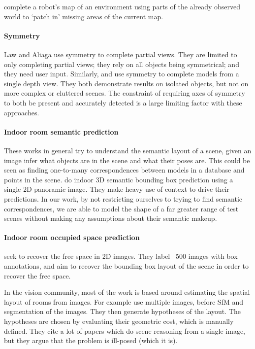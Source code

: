\documentclass[10pt,twocolumn,letterpaper]{article}
\begin{document}
\cite{chang-tor-2007} complete a robot's map of an environment using parts of the already observed world to  `patch in' missing areas of the current map.

\paragraph{Symmetry}
Law and Aliaga \cite{law-cviu-2010} use symmetry to complete partial views. 
They are limited to only completing partial views; they rely on all objects being symmetrical; and they need user input.
Similarly, \cite{thrun-iccv-2005} and \cite{kroemer-humanoids-2012} use symmetry to complete models from a single depth view. 
They both demonstrate results on isolated objects, but not on more complex or cluttered scenes. 
The constraint of requiring axes of symmetry to both be present and accurately detected is a large limiting factor with these approaches.

\paragraph{Indoor room semantic prediction}
These works in general try to understand the semantic layout of a scene, \ie given an image infer what objects are in the scene and what their poses are.
\cite{nan-acm-2012, minkim-siggraphasia-2012}
This could be seen as finding one-to-many correspondences between models in a database and points in the scene.
\cite{zhang-eccv-2014} do indoor 3D semantic bounding box prediction using a single 2D panoramic image. They make heavy use of context to drive their predictions.
In our work, by not restricting ourselves to trying to find semantic correspondences, we are able to model the shape of a far greater range of test scenes without making any assumptions about their semantic makeup.

\paragraph{Indoor room occupied space prediction}
\cite{hedau-cvpr-2012} seek to recover the free space in 2D images. They label ~500 images with box annotations, and aim to recover the bounding box layout of the scene in order to recover the free space.

In the vision community, most of the work is based around estimating the spatial layout of rooms from images.
For example \cite{bao-wacv-2014} use multiple images, before SfM and segmentation of the images. 
They then generate hypotheses of the layout. 
The hypotheses are chosen by evaluating their geometric cost, which is manually defined. 
They cite a lot of papers which do scene reasoning from a single image, but they argue that the problem is ill-posed (which it is). 
\end{document}
